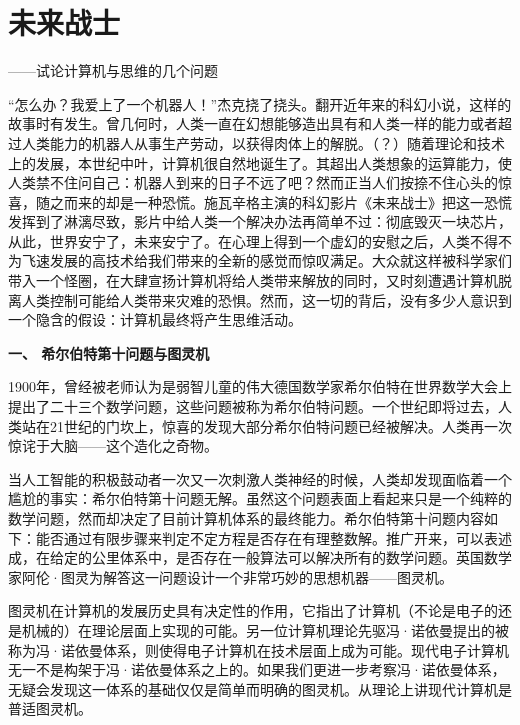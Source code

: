 \section{未来战士}
\centerline{
	\yuesong ——试论计算机与思维的几个问题
}

\mbox{}

“怎么办？我爱上了一个机器人！”杰克挠了挠头。翻开近年来的科幻小说，这样的故事时有发生。曾几何时，人类一直在幻想能够造出具有和人类一样的能力或者超过人类能力的机器人从事生产劳动，以获得肉体上的解脱。（？）随着理论和技术上的发展，本世纪中叶，计算机很自然地诞生了。其超出人类想象的运算能力，使人类禁不住问自己：机器人到来的日子不远了吧？然而正当人们按捺不住心头的惊喜，随之而来的却是一种恐慌。施瓦辛格主演的科幻影片《未来战士》把这一恐慌发挥到了淋漓尽致，影片中给人类一个解决办法再简单不过：彻底毁灭一块芯片，从此，世界安宁了，未来安宁了。在心理上得到一个虚幻的安慰之后，人类不得不为飞速发展的高技术给我们带来的全新的感觉而惊叹满足。大众就这样被科学家们带入一个怪圈，在大肆宣扬计算机将给人类带来解放的同时，又时刻遭遇计算机脱离人类控制可能给人类带来灾难的恐惧。然而，这一切的背后，没有多少人意识到一个隐含的假设：计算机最终将产生思维活动。

\textbf{一、 希尔伯特第十问题与图灵机}

1900年，曾经被老师认为是弱智儿童的伟大德国数学家希尔伯特在世界数学大会上提出了二十三个数学问题，这些问题被称为希尔伯特问题。一个世纪即将过去，人类站在21世纪的门坎上，惊喜的发现大部分希尔伯特问题已经被解决。人类再一次惊诧于大脑——这个造化之奇物。

当人工智能的积极鼓动者一次又一次刺激人类神经的时候，人类却发现面临着一个尴尬的事实：希尔伯特第十问题无解。虽然这个问题表面上看起来只是一个纯粹的数学问题，然而却决定了目前计算机体系的最终能力。希尔伯特第十问题内容如下：能否通过有限步骤来判定不定方程是否存在有理整数解。推广开来，可以表述成，在给定的公里体系中，是否存在一般算法可以解决所有的数学问题。英国数学家阿伦·图灵为解答这一问题设计一个非常巧妙的思想机器——图灵机。

图灵机在计算机的发展历史具有决定性的作用，它指出了计算机（不论是电子的还是机械的）在理论层面上实现的可能。另一位计算机理论先驱冯·诺依曼提出的被称为冯·诺依曼体系，则使得电子计算机在技术层面上成为可能。现代电子计算机无一不是构架于冯·诺依曼体系之上的。如果我们更进一步考察冯·诺依曼体系，无疑会发现这一体系的基础仅仅是简单而明确的图灵机。从理论上讲现代计算机是普适图灵机。

